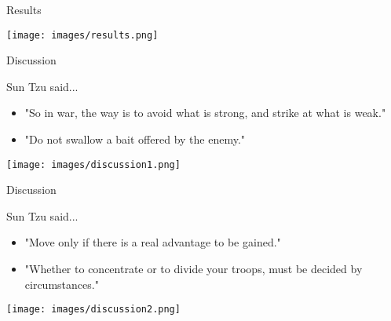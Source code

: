 \documentclass{beamer}
\begin{document}
\begin{frame}{Results}

\begin{center} \texttt{[image: images/results.png]} \end{center}

\end{frame}


\begin{frame}{Discussion}

\begin{block}{Sun Tzu said... \cite{sun_tzu_art_of_war_132}}
\begin{itemize}
\item "So in war, the way is to avoid what is strong, and strike at what is weak."
\item "Do not swallow a bait offered by the enemy."
\end{itemize}
\end{block}

\begin{center} \texttt{[image: images/discussion1.png]} \end{center}

\end{frame}


\begin{frame}{Discussion}

\begin{block}{Sun Tzu said... \cite{sun_tzu_art_of_war_132}}
\begin{itemize}
\item "Move only if there is a real advantage to be gained."
\item "Whether to concentrate or to divide your troops, must be decided by circumstances."
\end{itemize}
\end{block}

\begin{center} \texttt{[image: images/discussion2.png]} \end{center}

\end{frame}

\end{document}
